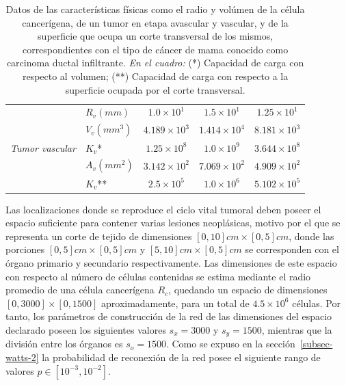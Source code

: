 \begin{table}[!ht]
\begin{center}
{\begin{tabular}{|c|c|c|c|c|}
 & \multicolumn{1}{|l|}{$R_v(mm)$} & \multicolumn{1}{|c|}{$1$.$0 \times 10^1$} & \multicolumn{1}{|c|}{$1$.$5 \times 10^1$} & \multicolumn{1}{|c|}{$1$.$25 \times 10^1$} \\\cline{2-5}
 & \multicolumn{1}{|l|}{$V_v(mm^3)$} & \multicolumn{1}{|c|}{$4$.$189 \times 10^3$} & \multicolumn{1}{|c|}{$1$.$414 \times 10^4$} & \multicolumn{1}{|c|}{$8$.$181 \times 10^3$} \\\cline{2-5} 
\emph{Tumor vascular} & \multicolumn{1}{|l|}{$K_v$*} & \multicolumn{1}{|c|}{$1$.$25 \times 10^8$} & \multicolumn{1}{|c|}{$1$.$0 \times 10^9$}& \multicolumn{1}{|c|}{$3$.$644 \times 10^8$} \\\cline{2-5} 
 & \multicolumn{1}{|l|}{$A_v(mm^2)$} & \multicolumn{1}{|c|}{$3$.$142 \times 10^2$} & \multicolumn{1}{|c|}{$7$.$069 \times 10^2$} & \multicolumn{1}{|c|}{$4$.$909 \times 10^2$}\\\cline{2-5} 
 & \multicolumn{1}{|l|}{$K_v$**} & \multicolumn{1}{|c|}{$2$.$5 \times 10^5$} & \multicolumn{1}{|c|}{$1$.$0 \times 10^6$} & \multicolumn{1}{|c|}{$5$.$102 \times 10^5$}\\\hline
\end{tabular}}\vspace*{-0.5cm}
\end{center}
\caption[Datos de las caracter\'isticas f\'isicas como el radio y vol\'umen de la c\'elula cancer\'igena, de un tumor en etapa avascular y vascular, y de la superficie que ocupa un corte transversal de los mismos]{Datos de las caracter\'isticas f\'isicas como el radio y vol\'umen de la c\'elula cancer\'igena, de un tumor en etapa avascular y vascular, y de la superficie que ocupa un corte transversal de los mismos, correspondientes con el tipo de c\'ancer de mama conocido como carcinoma ductal infiltrante. \emph{En el cuadro:} (*) Capacidad de carga con respecto al volumen; (**) Capacidad de carga con respecto a la superficie ocupada por el corte transversal.}
\label{table-original-values}
\end{table} 

Las localizaciones donde se reproduce el ciclo vital tumoral deben poseer el espacio suficiente para contener varias lesiones neopl\'asicas, motivo por el que se representa un corte de tejido de dimensiones $[0,10]cm \times [0,5]cm$, donde las porciones $[0,5]cm \times [0,5]cm$ y $[5,10]cm \times [0,5]cm$ se corresponden con el \'organo primario y secundario respectivamente. Las dimensiones de este espacio con respecto al n\'umero de c\'elulas contenidas se estima mediante el radio promedio de una c\'elula cancer\'igena $R_c$, quedando un espacio de dimensiones $[0, 3000] \times [0, 1500]$ aproximadamente, para un total de $4$.$5 \times 10^6$ c\'elulas. Por tanto, los par\'ametros de construcci\'on de la red de las dimensiones del espacio declarado poseen los siguientes valores $s_x = 3000$ y $s_y = 1500$, mientras que la divisi\'on entre los \'organos es $s_o = 1500$. Como se expuso en la secci\'on~\ref{subsec-watts-2} la probabilidad de reconexi\'on de la red posee el siguiente rango de valores $p \in [10^{-3},10^{-2}]$.

